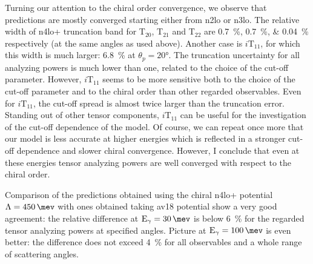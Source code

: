     Turning our attention to the chiral order convergence, we
    observe that predictions are mostly converged starting either from \gls{n2lo} or \gls{n3lo}.
    The relative width of \gls{n4lo+} truncation band 
    for T$_{20}$, T$_{21}$ and T$_{22}$
    are \SIlist{0.7; 0.7; 0.04}{\percent} respectively (at the same angles as used above).
    Another case is $i\text{T}_{11}$, for which this width is much larger: \SI{6.8}{\percent} at $\theta_p = \ang{20}$.
    The truncation uncertainty for all analyzing powers is much lower than one,
    related to the choice of the cut-off parameter.
    However, $i\text{T}_{11}$ seems to be more sensitive both
    to the choice of the cut-off parameter and to the chiral order than other regarded observables.
    Even for $i\text{T}_{11}$, the cut-off spread is almost twice larger than the truncation error.
    Standing out of other tensor components, $i\text{T}_{11}$ can be useful for the investigation of 
    the cut-off dependence of the model.
    Of course, we can repeat once more that 
    our model is less accurate at higher energies which is reflected
    in a stronger cut-off dependence and slower chiral convergence.
    However, I conclude that even at these energies tensor analyzing powers are
    well converged with respect to the chiral order.

    Comparison of the predictions obtained using the chiral \gls{n4lo+} potential
    $\Lambda = \SI{450}{\mev}$ with ones obtained taking \gls{av18} potential
    show a very good agreement: the relative difference at $\text{E}_\gamma=\SI{30}{\mev}$
    is below \SI{6}{\percent} for the regarded tensor analyzing powers at specified angles.
    Picture at  $\text{E}_\gamma=\SI{100}{\mev}$ is even better: the difference does not exceed 
    \SI{4}{\percent} for all observables and a whole range of scattering angles.


